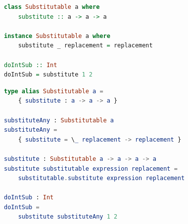 \begin{lstlisting}[language=Haskell,style=inline,caption={Haskell typeclass example},label={lst:haskell-typeclass}]
class Substitutable a where 
    substitute :: a -> a -> a
    
instance Substitutable a where
    substitute _ replacement = replacement

doIntSub :: Int
doIntSub = substitute 1 2 
\end{lstlisting}


\begin{lstlisting}[language=elm,style=inline,caption={Elm typeclass simulation example},label={lst:elm-typeclass}]
type alias Substitutable a =
    { substitute : a -> a -> a }

substituteAny : Substitutable a
substituteAny =
    { substitute = \_ replacement -> replacement }

substitute : Substitutable a -> a -> a -> a
substitute substitutable expression replacement =
    substitutable.substitute expression replacement

doIntSub : Int
doIntSub =
    substitute substituteAny 1 2
\end{lstlisting}